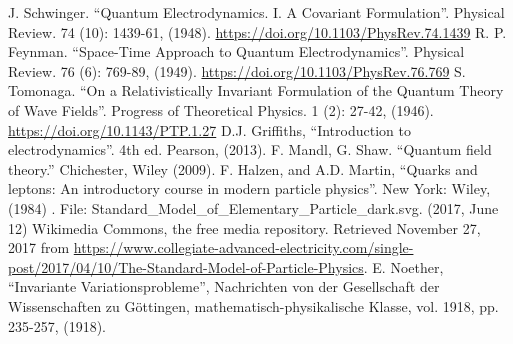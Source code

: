 \documentclass[print]{nuthesis}
\begin{document}

\nocite{*}
\begin{thebibliography}{300}
 J. Schwinger. ``Quantum Electrodynamics. I. A Covariant Formulation''. Physical Review. 74 (10): 1439-61, (1948). \url{https://doi.org/10.1103/PhysRev.74.1439} 
 R. P. Feynman. ``Space-Time Approach to Quantum Electrodynamics''. Physical Review. 76 (6): 769-89, (1949). \url{https://doi.org/10.1103/PhysRev.76.769}
 S. Tomonaga. ``On a Relativistically Invariant Formulation of the Quantum Theory of Wave Fields''. Progress of Theoretical Physics. 1 (2): 27-42, (1946). \url{https://doi.org/10.1143/PTP.1.27}
 D.J. Griffiths, ``Introduction to electrodynamics''. 4th ed. Pearson, (2013).
 F. Mandl, G. Shaw. ``Quantum field theory.'' Chichester, Wiley (2009).
 F. Halzen, and A.D. Martin, ``Quarks and leptons: An introductory course in modern particle physics''. New York: Wiley, (1984) .
 File: Standard\_Model\_of\_Elementary\_Particle\_dark.svg. (2017, June 12) Wikimedia Commons, the free media repository. Retrieved November 27, 2017 from \url{https://www.collegiate-advanced-electricity.com/single-post/2017/04/10/The-Standard-Model-of-Particle-Physics}.
  E. Noether, ``Invariante Variationsprobleme'', Nachrichten von der Gesellschaft der Wissenschaften zu G\"ottingen, mathematisch-physikalische Klasse, vol. 1918, pp. 235-257, (1918).

\end{thebibliography}
\end{document}
